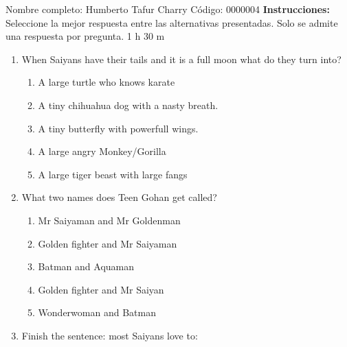 \documentclass[letterpaper,addpoints,answers,twocolumn,10pt]{exam}
\begin{document}
\noindent Nombre completo: Humberto Tafur Charry
\newline \newline \newline \newline
Código: 0000004\newline \newline 
{\bf Instrucciones:} Seleccione la mejor respuesta entre las alternativas presentadas. Solo se admite una respuesta por pregunta.
 1 h 30 m

\begin{enumerate}[leftmargin=.2in]




\item  When Saiyans have their tails and it is a full moon what do they turn into?


\begin{enumerate}[noitemsep,leftmargin=0in]


\item  A large turtle who knows karate
\item  A tiny chihuahua dog with a nasty breath.
\item  A tiny butterfly with powerfull wings.
\item  A large angry Monkey/Gorilla
\item  A large tiger beast with large fangs


\end{enumerate}



\item  What two names does Teen Gohan get called?


\begin{enumerate}[noitemsep,leftmargin=0in]


\item  Mr Saiyaman and Mr Goldenman
\item  Golden fighter and Mr Saiyaman
\item  Batman and Aquaman
\item  Golden fighter and Mr Saiyan
\item  Wonderwoman and Batman


\end{enumerate}



\item  Finish the sentence: most Saiyans love to:


\begin{enumerate}[noitemsep,leftmargin=0in]



\end{enumerate}
\end{enumerate}
\end{document}
